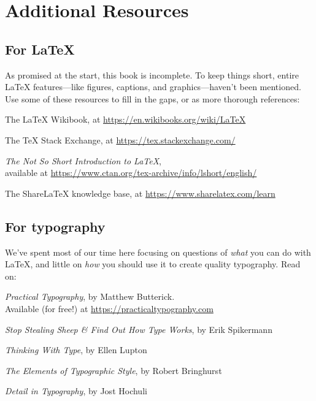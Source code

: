 \setlength\parskip{0.8\baselineskip}
\setlength\parindent{0pt}

\chapter{Additional Resources}
\label{resources}

\section{For \texorpdfstring{\LaTeX}{LaTeX}}

As promised at the start, this book is incomplete.
To keep things short,
entire \LaTeX{} features---like figures, captions, and graphics---haven't
been mentioned.
Use some of these resources to fill in the gaps,
or as more thorough references:

\begin{adjustwidth}{1.5em}{0pt}
The \LaTeX{} Wikibook, at \url{https://en.wikibooks.org/wiki/LaTeX}

The \TeX{} Stack Exchange, at \url{https://tex.stackexchange.com/}

\textit{The Not So Short Introduction to \LaTeX}, \\
available at \url{https://www.ctan.org/tex-archive/info/lshort/english/}

The Share\LaTeX{} knowledge base, at \url{https://www.sharelatex.com/learn}

\end{adjustwidth}

\section{For typography}

We've spent most of our time here focusing on questions of \emph{what}
you can do with \LaTeX,
and little on \emph{how} you should use it to create quality typography.
Read on:

\begin{adjustwidth}{1.5em}{0pt}
\textit{Practical Typography}, by Matthew Butterick. \\
Available (for free!) at \url{https://practicaltypography.com}

\textit{Stop Stealing Sheep \& Find Out How Type Works}, by Erik Spikermann

\textit{Thinking With Type}, by Ellen Lupton

\textit{The Elements of Typographic Style}, by Robert Bringhurst

\textit{Detail in Typography}, by Jost Hochuli
\end{adjustwidth}

